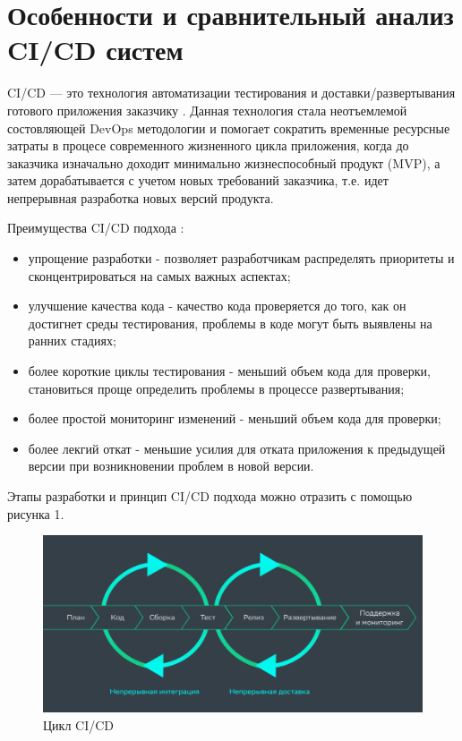 \section{Особенности и сравнительный анализ CI/CD систем} \label{ch1:sec2}

CI/CD — это технология автоматизации тестирования и доставки/развертывания готового приложения заказчику  \cite{cicd}. Данная технология стала неотъемлемой состовляющей DevOps методологии и помогает сократить временные  ресурсные затраты в процесе современного жизненного цикла приложения, когда до заказчика изначально доходит минимально жизнеспособный продукт (MVP), а затем дорабатывается с учетом новых требований заказчика, т.е. идет непрерывная разработка новых версий продукта.

Преимущества CI/CD подхода \cite{plusci}:

\begin{itemize}
	\item упрощение разработки - позволяет разработчикам распределять приоритеты и сконцентрироваться на самых важных аспектах;
	\item улучшение качества кода -  качество кода проверяется до того, как он достигнет среды тестирования, проблемы в коде могут быть выявлены на ранних стадиях;
	\item более короткие циклы тестирования - меньший объем кода для проверки, становиться проще определить проблемы в процессе развертывания;
	\item более простой мониторинг изменений - меньший объем кода для проверки;
	\item более лекгий откат - меньшие усилия для отката приложения к предыдущей версии при возникновении проблем в новой версии.
\end{itemize}

Этапы разработки и принцип CI/CD подхода можно отразить с помощью рисунка 1.

\begin{figure}[ht!] 
	\center
	\includegraphics [scale=0.67] {my_folder/images//cicdalter}
	\caption{Цикл CI/CD \cite{cycleci}} 
	\label{fig:ci-cd}  
\end{figure}

